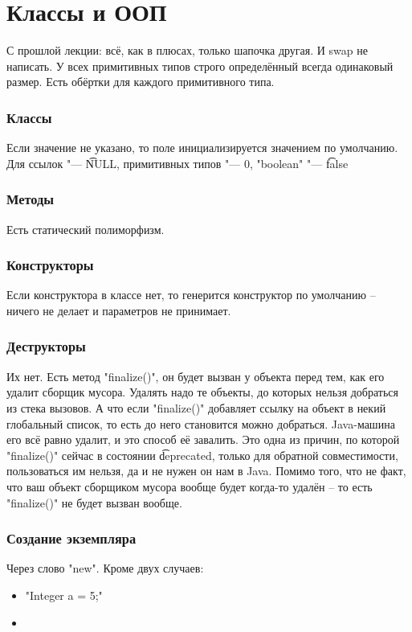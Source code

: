 \chapter{Классы и ООП}

С прошлой лекции: всё, как в плюсах, только шапочка другая. И swap не написать.
У всех примитивных типов строго определённый всегда одинаковый размер. Есть обёртки для каждого примитивного типа.

\subsection{Классы}

Если значение не указано, то поле инициализируется значением по умолчанию.
Для ссылок "--- \t{NULL}, примитивных типов "--- $0$, \java"boolean" "--- \t{false}

\subsection{Методы}
Есть статический полиморфизм.

\subsection{Конструкторы}
Если конструктора в классе нет, то генерится конструктор по умолчанию -- ничего не делает и параметров не принимает.

\subsection{Деструкторы}
Их нет. Есть метод \java"finalize()", он будет вызван у объекта перед тем, как его удалит сборщик мусора.
Удалять надо те объекты, до которых нельзя добраться из стека вызовов.
А что если \java"finalize()" добавляет ссылку на объект в некий глобальный список, то есть до него становится можно добраться.
Java-машина его всё равно удалит, и это способ её завалить. Это одна из причин, по которой \java"finalize()" сейчас в состоянии 
\t{deprecated}, только для обратной совместимости, пользоваться им нельзя, да и не нужен он нам в Java.
Помимо того, что не факт, что ваш объект сборщиком мусора вообще будет когда-то удалён -- то есть \java"finalize()"
не будет вызван вообще.


\subsection{Создание экземпляра}
Через слово \java"new". Кроме двух случаев:
\begin{itemize}
	\item
		\java"Integer a = 5;"
	\item
\end{itemize}

